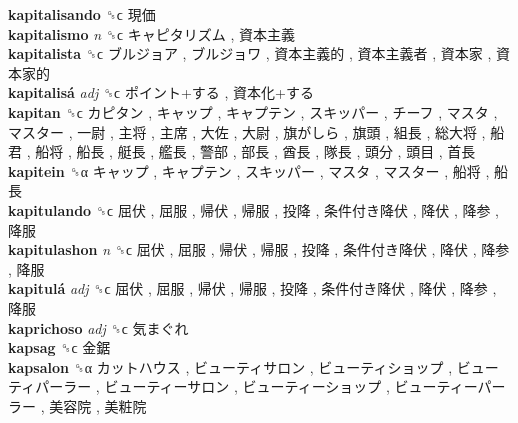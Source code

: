 \textbf{kapitalisando} ␝ϲ   現価   \\
\textbf{kapitalismo} \emph{n}  ␝ϲ   キャピタリズム ,  資本主義   \\
\textbf{kapitalista} ␝ϲ   ブルジョア ,  ブルジョワ ,  資本主義的 ,  資本主義者 ,  資本家 ,  資本家的   \\
\textbf{kapitalisá} \emph{adj}  ␝ϲ   ポイント+する ,  資本化+する   \\
\textbf{kapitan} ␝ϲ   カピタン ,  キャップ ,  キャプテン ,  スキッパー ,  チーフ ,  マスタ ,  マスター ,  一尉 ,  主将 ,  主席 ,  大佐 ,  大尉 ,  旗がしら ,  旗頭 ,  組長 ,  総大将 ,  船君 ,  船将 ,  船長 ,  艇長 ,  艦長 ,  警部 ,  部長 ,  酋長 ,  隊長 ,  頭分 ,  頭目 ,  首長   \\
\textbf{kapitein} ␝α   キャップ ,  キャプテン ,  スキッパー ,  マスタ ,  マスター ,  船将 ,  船長   \\
\textbf{kapitulando} ␝ϲ   屈伏 ,  屈服 ,  帰伏 ,  帰服 ,  投降 ,  条件付き降伏 ,  降伏 ,  降参 ,  降服   \\
\textbf{kapitulashon} \emph{n}  ␝ϲ   屈伏 ,  屈服 ,  帰伏 ,  帰服 ,  投降 ,  条件付き降伏 ,  降伏 ,  降参 ,  降服   \\
\textbf{kapitulá} \emph{adj}  ␝ϲ   屈伏 ,  屈服 ,  帰伏 ,  帰服 ,  投降 ,  条件付き降伏 ,  降伏 ,  降参 ,  降服   \\
\textbf{kaprichoso} \emph{adj}  ␝ϲ   気まぐれ   \\
\textbf{kapsag} ␝ϲ   金鋸   \\
\textbf{kapsalon} ␝α   カットハウス ,  ビューティサロン ,  ビューティショップ ,  ビューティパーラー ,  ビューティーサロン ,  ビューティーショップ ,  ビューティーパーラー ,  美容院 ,  美粧院   \\
